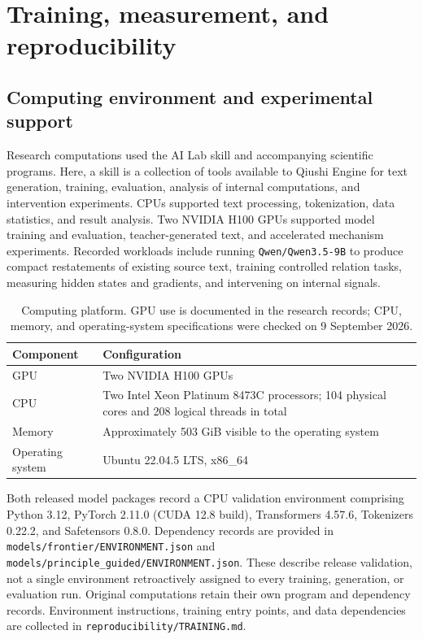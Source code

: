 \section{Training, measurement, and reproducibility}
\label{app:repro}

\subsection{Computing environment and experimental support}
\label{app:compute}

Research computations used the AI Lab skill and accompanying scientific programs. Here, a skill is a collection of tools available to Qiushi Engine for text generation, training, evaluation, analysis of internal computations, and intervention experiments. CPUs supported text processing, tokenization, data statistics, and result analysis. Two NVIDIA H100 GPUs supported model training and evaluation, teacher-generated text, and accelerated mechanism experiments. Recorded workloads include running \nolinkurl{Qwen/Qwen3.5-9B} to produce compact restatements of existing source text, training controlled relation tasks, measuring hidden states and gradients, and intervening on internal signals.

\begin{table}[htbp]
\caption{Computing platform. GPU use is documented in the research records; CPU, memory, and operating-system specifications were checked on 9 September 2026.}
\label{tab:compute_platform}
\small
\begin{tabularx}{\linewidth}{@{}P{30mm}Y@{}}
\toprule Component & Configuration\\\midrule
GPU & Two NVIDIA H100 GPUs\\
CPU & Two Intel Xeon Platinum 8473C processors; 104 physical cores and 208 logical threads in total\\
Memory & Approximately 503 GiB visible to the operating system\\
Operating system & Ubuntu 22.04.5 LTS, x86\_64\\
\bottomrule
\end{tabularx}
\end{table}

Both released model packages record a CPU validation environment comprising Python 3.12, PyTorch 2.11.0 (CUDA 12.8 build), Transformers 4.57.6, Tokenizers 0.22.2, and Safetensors 0.8.0. Dependency records are provided in \nolinkurl{models/frontier/ENVIRONMENT.json} and \nolinkurl{models/principle_guided/ENVIRONMENT.json}. These describe release validation, not a single environment retroactively assigned to every training, generation, or evaluation run. Original computations retain their own program and dependency records. Environment instructions, training entry points, and data dependencies are collected in \nolinkurl{reproducibility/TRAINING.md}.

